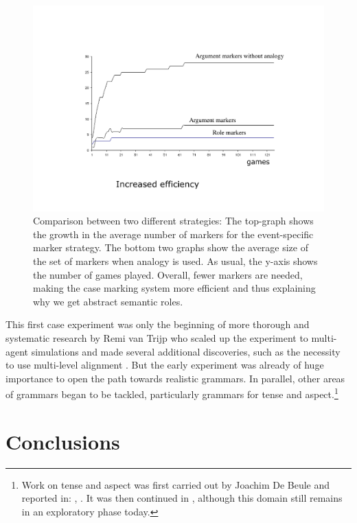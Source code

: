 \begin{figure}[htbp]
  \centerline{\includegraphics[width=\textwidth]{chap10/figs/comparison.pdf}}
\caption{\label{fig:comparison}Comparison between two different strategies: The top-graph shows the growth in the average number of 
markers for the event-specific marker strategy. 
The bottom two graphs show the average size of the set of markers when analogy is used. As usual, the y-axis shows 
the number of games played. Overall, fewer markers are needed, making the case marking system more efficient 
and thus explaining why we get abstract semantic roles.}
\end{figure}

This first case experiment was only the beginning of more thorough and systematic research by Remi van Trijp who 
scaled up the experiment to multi-agent simulations and made several additional discoveries, such as the necessity 
to use multi-level alignment \citep{Steels:07d}. 
But the early experiment was already of huge importance to open the path towards realistic grammars. 
In parallel, other areas of grammars began to be tackled, 
particularly grammars for tense and aspect.\footnote{
Work on tense and aspect was first carried out by Joachim De Beule and reported in: \cite{DeBeule:2004}, \cite{DeBeule:2006}. 
It was then continued in \citep{Gerasymova:2012}, 
although this domain still remains in an exploratory phase today.}

\section{Conclusions} 


